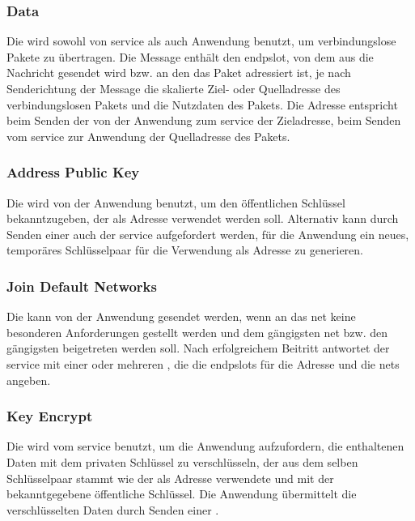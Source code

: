 \asprotoslotassignbytefield


\subsubsection{Data}
\label{dcl-asproto-data}
Die \msg{\asprotodata} wird sowohl von \gls{service} als auch Anwendung benutzt,
um verbindungslose Pakete zu übertragen.
Die Message enthält den \gls{endpslot}, von dem aus die Nachricht gesendet wird
bzw. an den das Paket adressiert ist, je nach Senderichtung der Message die
skalierte Ziel- oder Quelladresse des verbindungslosen Pakets und die Nutzdaten
des Pakets.
Die Adresse entspricht beim Senden der \msg{\asprotodata} von der Anwendung zum
\gls{service} der Zieladresse, beim Senden vom \gls{service} zur Anwendung der
Quelladresse des Pakets.

\asprotodatabytefield


\subsubsection{Address Public Key}
\label{dcl-asproto-addrpubkey}
Die \msg{\asprotoaddrpubkey} wird von der Anwendung benutzt, um den öffentlichen
Schlüssel bekanntzugeben, der als Adresse verwendet werden soll.
Alternativ kann durch Senden einer \msg{\asprotogenkey} auch der \gls{service}
aufgefordert werden, für die Anwendung ein neues, temporäres Schlüsselpaar für
die Verwendung als Adresse zu generieren.

\asprotoaddrpubkeybytefield


\subsubsection{Join Default Networks}
\label{dcl-asproto-joindefnets}
Die \msg{\asprotojoindefnets} kann von der Anwendung gesendet werden, wenn
an das \gls{net} keine besonderen Anforderungen gestellt werden und dem
gängigsten \gls{net} bzw. den gängigsten  beigetreten
werden soll.
Nach erfolgreichem Beitritt antwortet der \gls{service} mit einer oder mehreren
\msgpl{\asprotoslotassign}, die die \glspl{endpslot} für die Adresse und die
\glspl{net} angeben.

\asprotojoindefnetsbytefield


\subsubsection{Key Encrypt}
\label{dcl-asproto-keyenc}
Die \msg{\asprotokeyenc} wird vom \gls{service} benutzt, um die Anwendung
aufzufordern, die enthaltenen Daten mit dem privaten Schlüssel zu verschlüsseln,
der aus dem selben Schlüsselpaar stammt wie der als Adresse verwendete und mit
der \msg{\asprotoaddrpubkey} bekanntgegebene öffentliche Schlüssel.
Die Anwendung übermittelt die verschlüsselten Daten durch Senden einer
\msg{\asprotocryptoresponse}.

